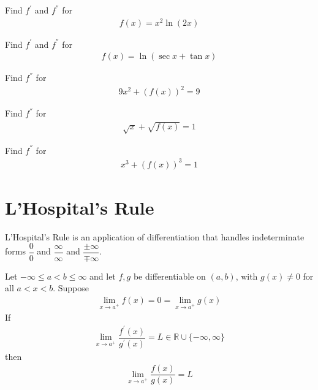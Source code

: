 \begin{exercise}
Find $f^{'}$ and $f^{''}$ for
\begin{align*}
    f(x) = x^{2}\ln(2x)
\end{align*}
\end{exercise}

\begin{exercise}
Find $f^{'}$ and $f^{''}$ for 
\begin{align*}
    f(x) = \ln(\sec x + \tan x)
\end{align*}
\end{exercise}

\begin{exercise}
Find $f^{''}$ for
\begin{align*}
    9x^{2} + (f(x))^{2} = 9
\end{align*}
\end{exercise}

\begin{exercise}
Find $f^{''}$ for 
\begin{align*}
    \sqrt{x} + \sqrt{f(x)} = 1
\end{align*}
\end{exercise}

\begin{exercise}
Find $f^{''}$ for 
\begin{align*}
    x^{3} + (f(x))^{3} = 1
\end{align*}
\end{exercise}

\newpage
\section{L'Hospital's Rule}

L'Hospital's Rule is an application of differentiation that handles indeterminate forms $\dfrac{0}{0}$ and $\dfrac{\infty}{\infty}$ and $\dfrac{\pm \infty}{\mp \infty}$.

\vspace{0.1in}
\begin{theorem}
Let $-\infty \leq a < b \leq \infty$ and let $f, g$ be differentiable on $(a, b)$, with $g(x) \neq 0$ for all $a < x < b$. Suppose 
\begin{align*}
    \lim_{x \longrightarrow a^{+}} f(x) = 0 = \lim_{x \longrightarrow a^{+}} g(x)
\end{align*}
If
\begin{align*}
    \lim_{x \longrightarrow a^{+}} \dfrac{f^{'}(x)}{g^{'}(x)} = L \in \mathbb{R} \cup \{-\infty, \infty\}
\end{align*}
then
\begin{align*}
    \lim_{x \longrightarrow a^{+}} \dfrac{f(x)}{g(x)} = L
\end{align*}
\label{L'Hospital_1}
\end{theorem}

